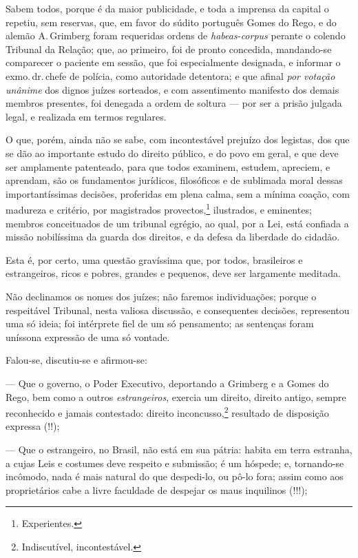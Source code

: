 Sabem todos, porque é da maior publicidade, e toda a imprensa da capital
o repetiu, sem reservas, que, em favor do súdito português Gomes do
Rego, e do alemão A.\,Grimberg foram requeridas ordens de
\emph{habeas-corpus} perante o colendo Tribunal da Relação; que, ao
primeiro, foi de pronto concedida, mandando-se comparecer o paciente em
sessão, que foi especialmente designada, e informar o exmo.\,dr.\,chefe de
polícia, como autoridade detentora; e que afinal \emph{por votação
unânime} dos dignos juízes sorteados, e com assentimento manifesto dos
demais membros presentes, foi denegada a ordem de soltura --- por ser a
prisão julgada legal, e realizada em termos regulares.

O que, porém, ainda não se sabe, com incontestável prejuízo dos
legistas, dos que se dão ao importante estudo do direito público, e do
povo em geral, e que deve ser amplamente patenteado, para que todos
examinem, estudem, apreciem, e aprendam, são os fundamentos jurídicos,
filosóficos e de sublimada moral dessas importantíssimas decisões,
proferidas em plena calma, sem a mínima coação, com madureza e critério,
por magistrados provectos,\footnote{Experientes.} ilustrados, e
eminentes; membros conceituados de um tribunal egrégio, ao qual, por a
Lei, está confiada a missão nobilíssima da guarda dos direitos, e da
defesa da liberdade do cidadão.

Esta é, por certo, uma questão gravíssima que, por todos, brasileiros e
estrangeiros, ricos e pobres, grandes e pequenos, deve ser largamente
meditada.

Não declinamos os nomes dos juízes; não faremos individuações; porque o
respeitável Tribunal, nesta valiosa discussão, e consequentes decisões,
representou uma só ideia; foi intérprete fiel de um só pensamento; as
sentenças foram uníssona expressão de uma só vontade.

Falou-se, discutiu-se e afirmou-se:

--- Que o governo, o Poder Executivo, deportando a Grimberg e a Gomes
  do Rego, bem como a outros \emph{estrangeiros}, exercia um direito,
  direito antigo, sempre reconhecido e jamais contestado: direito
  inconcusso,\footnote{Indiscutível, incontestável.} resultado de
  disposição expressa (!!);

--- Que o estrangeiro, no Brasil, não está em sua pátria: habita em
  terra estranha, a cujas Leis e costumes deve respeito e submissão; é
  um hóspede; e, tornando-se incômodo, nada é mais natural do que
  despedi-lo, ou pô-lo fora; assim como aos proprietários cabe a livre
  faculdade de despejar os maus inquilinos (!!!);

